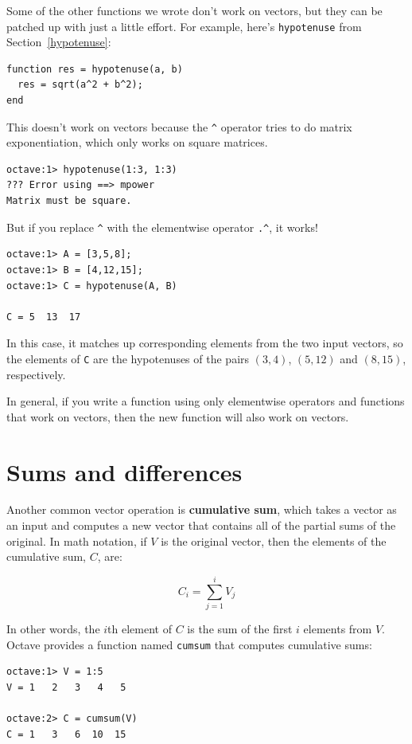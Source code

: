 \documentclass{book}
\begin{document}
Some of the other functions we wrote don't work on vectors,
but they can be patched up with just a little effort. For example,
here's {\tt hypotenuse} from Section~\ref{hypotenuse}:

\begin{verbatim}
function res = hypotenuse(a, b)
  res = sqrt(a^2 + b^2);
end
\end{verbatim}

This doesn't work on vectors because the \verb+^+ operator
tries to do matrix exponentiation, which only works on
square matrices.

\begin{verbatim}
octave:1> hypotenuse(1:3, 1:3)
??? Error using ==> mpower
Matrix must be square.
\end{verbatim}

But if you replace \verb+^+ with the elementwise operator
\verb+.^+, it works!

\begin{verbatim}
octave:1> A = [3,5,8];
octave:1> B = [4,12,15];
octave:1> C = hypotenuse(A, B)

C = 5  13  17
\end{verbatim}
 
In this case, it matches up corresponding elements from the two
input vectors, so the elements of {\tt C} are the hypotenuses of
the pairs $(3,4)$, $(5,12)$ and $(8,15)$, respectively.

In general, if you write a function using only elementwise
operators and functions that work on vectors, then the new
function will also work on vectors.


\section{Sums and differences}

Another common vector operation is {\bf cumulative sum}, which takes a
vector as an input and computes a new vector that contains all of the
partial sums of the original. In math notation, if $V$ is the
original vector, then the elements of the cumulative sum, $C$, are:

\[ C_i = \sum_{j=1}^i V_j \]

In other words, the $i$th element of $C$ is the sum of the first
$i$ elements from $V$. Octave provides a function named {\tt cumsum}
that computes cumulative sums:

\begin{verbatim}
octave:1> V = 1:5
V = 1   2   3   4   5

octave:2> C = cumsum(V)
C = 1   3   6  10  15
\end{verbatim}
\end{document}
